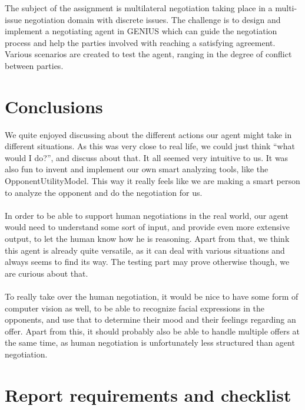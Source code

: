 \documentclass[11pt,a4paper]{article}
\begin{document}
The subject of the assignment is multilateral negotiation taking place in a multi-issue negotiation domain with discrete issues. The challenge is to design and implement a negotiating agent in GENIUS which can guide the negotiation process and help the parties involved with reaching a satisfying agreement. Various scenarios are created to test the agent, ranging in the degree of conflict between parties.\\



\newpage





\section{Conclusions}

We quite enjoyed discussing about the different actions our agent might take in different situations. As this was very close to real life, we could just think ``what would I do?'', and discuss about that. It all seemed very intuitive to us. It was also fun to invent and implement our own smart analyzing tools, like the OpponentUtilityModel. This way it really feels like we are making a smart person to analyze the opponent and do the negotiation for us.
\\\\
In order to be able to support human negotiations in the real world, our agent would need to understand some sort of input, and provide even more extensive output, to let the human know how he is reasoning. Apart from that, we think this agent is already quite versatile, as it can deal with various situations and always seems to find its way. The testing part may prove otherwise though, we are curious about that.
\\\\
To really take over the human negotiation, it would be nice to have some form of computer vision as well, to be able to recognize facial expressions in the opponents, and use that to determine their mood and their feelings regarding an offer. Apart from this, it should probably also be able to handle multiple offers at the same time, as human negotiation is unfortunately less structured than agent negotiation.

\newpage

\section*{Report requirements and checklist}
\end{document}
